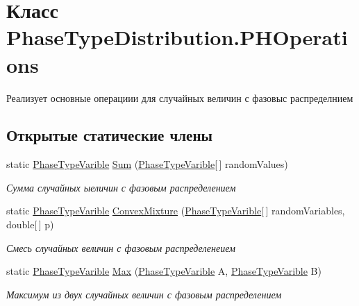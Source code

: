 \hypertarget{class_phase_type_distribution_1_1_p_h_operations}{}\section{Класс Phase\+Type\+Distribution.\+P\+H\+Operations}
\label{class_phase_type_distribution_1_1_p_h_operations}


Реализует основные операциии для случайных величин с фазовыс распределнием  


\subsection*{Открытые статические члены}
\begin{DoxyCompactItemize}
\item 
static \hyperlink{class_phase_type_distribution_1_1_phase_type_varible}{Phase\+Type\+Varible} \hyperlink{class_phase_type_distribution_1_1_p_h_operations_aa8b83fd384976ff4b159047a5bb77713}{Sum} (\hyperlink{class_phase_type_distribution_1_1_phase_type_varible}{Phase\+Type\+Varible}\mbox{[}$\,$\mbox{]} random\+Values)
\begin{DoxyCompactList}\small\item\em Сумма случайных ыеличин с фазовым распределением \end{DoxyCompactList}\item 
static \hyperlink{class_phase_type_distribution_1_1_phase_type_varible}{Phase\+Type\+Varible} \hyperlink{class_phase_type_distribution_1_1_p_h_operations_a2d0ec60638d8a8d24687c791fd6682f4}{Convex\+Mixture} (\hyperlink{class_phase_type_distribution_1_1_phase_type_varible}{Phase\+Type\+Varible}\mbox{[}$\,$\mbox{]} random\+Variables, double\mbox{[}$\,$\mbox{]} p)
\begin{DoxyCompactList}\small\item\em Смесь случайных величин с фазовым распределенеием \end{DoxyCompactList}\item 
static \hyperlink{class_phase_type_distribution_1_1_phase_type_varible}{Phase\+Type\+Varible} \hyperlink{class_phase_type_distribution_1_1_p_h_operations_a724d142f65c13b43a88d87924f2129bc}{Max} (\hyperlink{class_phase_type_distribution_1_1_phase_type_varible}{Phase\+Type\+Varible} A, \hyperlink{class_phase_type_distribution_1_1_phase_type_varible}{Phase\+Type\+Varible} B)
\begin{DoxyCompactList}\small\item\em Максимум из двух случайных величин с фазовым распределением \end{DoxyCompactList}\item 

\end{DoxyCompactItemize}
